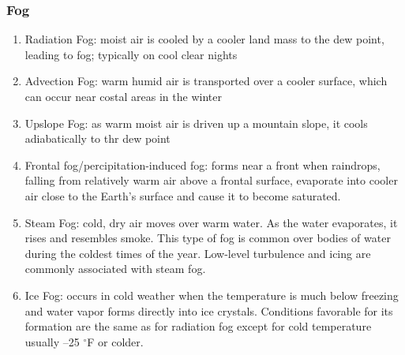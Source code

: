 \documentclass[12pt]{article}
\begin{document}
		\subsubsection{Fog}
			\begin{enumerate}
				\item Radiation Fog: moist air is cooled by a cooler land mass to the dew point, leading to fog; typically on cool clear nights
				\item Advection Fog: warm humid air is transported over a cooler surface, which can occur near costal areas in the winter
				\item Upslope Fog: as warm moist air is driven up a mountain slope, it cools adiabatically to thr dew point
				\item Frontal fog/percipitation-induced fog: forms near a front when raindrops, falling from relatively warm air above a frontal surface, evaporate into cooler air close to the Earth’s surface and cause it to become saturated.
				\item Steam Fog: cold, dry air moves over warm water. As the water evaporates, it rises and resembles smoke. This type of fog is common over bodies of water during the coldest times of the year. Low-level turbulence and icing are commonly associated with steam fog.
				\item Ice Fog: occurs in cold weather when the temperature is much below freezing and water vapor forms directly into ice crystals. Conditions favorable for its formation are the same as for radiation fog except for cold temperature usually –25 $^\circ$F or colder.
			\end{enumerate}
\end{document}
